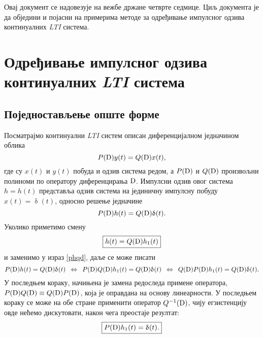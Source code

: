 Овај документ се надовезује на вежбе држане четврте 
седмице. Циљ документа је да обједини и појасни на примерима
методе за одређивање импулсног одзива континуалних 
\textit{LTI} система. 

\chapter{Одређивање импулсног одзива континуалних 
\textit{LTI} система} \label{a:impulsni_odziv}

\section{Поједностављење опште форме}

Посматрајмо континуални \textit{LTI} систем описан 
диференцијалном једначином облика
\begin{equation}
 P({\rm D}) y(t) = Q({\rm D}) x(t),
 \label{def}
\end{equation}
где су $x(t)$ и $y(t)$ побуда и одзив система редом, а  $P({\rm D})$ и $Q({\rm D})$ произвољни полиноми 
по оператору диференцирања $\rm D$. Импулсни  
одзив овог система $h = h(t)$ представља одзив система на 
јединичну импулсну
побуду $x(t) = \updelta(t)$, односно решење једначине
\begin{equation}
 P({\rm D}) h(t) = Q({\rm D}) \updelta(t).
 \label{phqd}
\end{equation}
Уколико приметимо смену 
\begin{equation}
\boxed{
 h(t) = Q({\rm D}) h_1(t)
} \label{hqh1}
\end{equation}
и заменимо у израз \eqref{phqd}, даље се може писати
\begin{equation}
P({\rm D}) h(t) = Q({\rm D}) \updelta(t) 
\enspace\Leftrightarrow\enspace
P({\rm D}) Q({\rm D}) h_1(t) = Q({\rm D}) \updelta(t) 
\enspace\Leftrightarrow\enspace
Q({\rm D}) P({\rm D}) h_1(t) = Q({\rm D}) \updelta(t). 
\end{equation}
У последњем кораку, начињена је замена редоследа 
примене оператора, $P({\rm D}) Q({\rm D})
\equiv Q({\rm D}) P({\rm D})$, која је 
оправдана на основу линеарности. У последњем 
кораку се може на обе стране применити оператор
$Q^{-1}({\rm D})$, чију егзистенцију овде нећемо
дискутовати, након чега преостаје резултат:
\begin{equation}
\boxed{
P({\rm D}) h_1(t) = \updelta(t). 
} \label{eq2}
\end{equation}

\noindent
{} 

